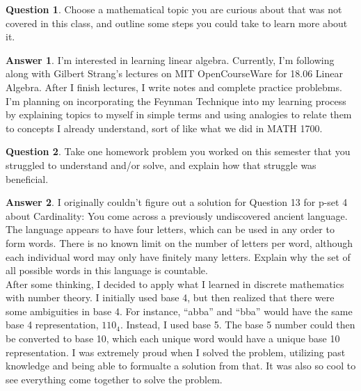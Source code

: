 \documentclass[article, 12pt]{article}
\theoremstyle{definition}
\newtheorem{question}{Question}
\newtheorem{answer}{Answer}
\begin{document}
    \begin{question}
        Choose a mathematical topic you are curious about that was not covered in this class, and outline some steps you could take to learn more about it.
    \end{question}
    \begin{answer}
        I'm interested in learning linear algebra. Currently, I'm following along with Gilbert Strang's lectures on MIT OpenCourseWare for 18.06 Linear Algebra. After I finish lectures, I write notes and complete practice problebms. I'm planning on incorporating the Feynman Technique into my learning process by explaining topics to myself in simple terms and using analogies to relate them to concepts I already understand, sort of like what we did in MATH 1700.
    \end{answer}

    \begin{question}
        Take one homework problem you worked on this semester that you struggled to understand and/or solve, and explain how that struggle was beneficial.
    \end{question}
    \begin{answer}
        I originally couldn't figure out a solution for Question 13 for p-set 4 about Cardinality: You come across a previously undiscovered ancient language. The language appears to have four letters, which can be used in any order to form words. There is no known limit on the number of letters per word, although each individual word may only have finitely many letters. Explain why the set of all possible words in this language is countable. 
        \\[12pt]
        After some thinking, I decided to apply what I learned in discrete mathematics with number theory. I initially used base 4, but then realized that there were some ambiguities in base 4. For instance, ``abba'' and ``bba'' would have the same base 4 representation, $110_4$. Instead, I used base 5. The base 5 number could then be converted to base 10, which each unique word would have a unique base 10 representation. I was extremely proud when I solved the problem, utilizing past knowledge and being able to formualte a solution from that. It was also so cool to see everything come together to solve the problem.
    \end{answer}
\end{document}
